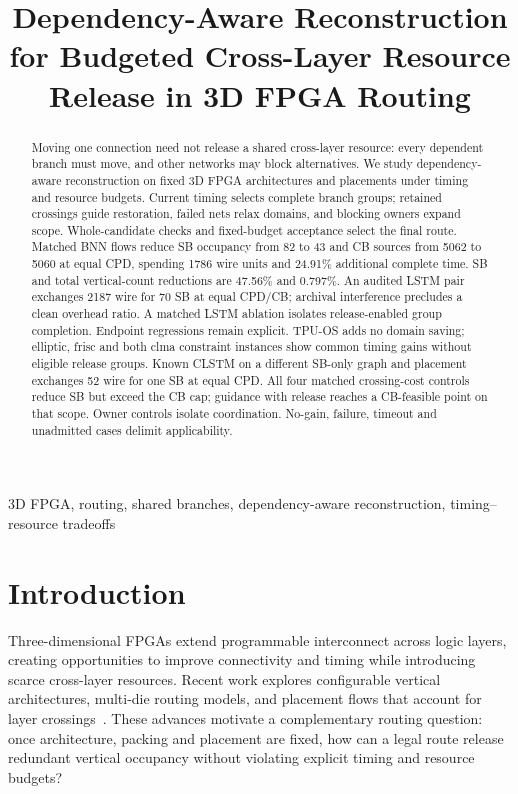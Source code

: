 \documentclass[conference,10pt]{IEEEtran}
\title{Dependency-Aware Reconstruction for Budgeted Cross-Layer Resource Release in 3D FPGA Routing}
\author{\IEEEauthorblockN{Anonymous submission}}
\begin{document}
\maketitle
\begin{abstract}
Moving one connection need not release a shared cross-layer resource: every dependent branch must move, and other networks may block alternatives. We study dependency-aware reconstruction on fixed 3D FPGA architectures and placements under timing and resource budgets. Current timing selects complete branch groups; retained crossings guide restoration, failed nets relax domains, and blocking owners expand scope. Whole-candidate checks and fixed-budget acceptance select the final route. Matched BNN flows reduce SB occupancy from 82 to 43 and CB sources from 5062 to 5060 at equal CPD, spending 1786 wire units and 24.91\% additional complete time. SB and total vertical-count reductions are 47.56\% and 0.797\%. An audited LSTM pair exchanges 2187 wire for 70 SB at equal CPD/CB; archival interference precludes a clean overhead ratio. A matched LSTM ablation isolates release-enabled group completion. Endpoint regressions remain explicit. TPU-OS adds no domain saving; elliptic, frisc and both clma constraint instances show common timing gains without eligible release groups. Known CLSTM on a different SB-only graph and placement exchanges 52 wire for one SB at equal CPD. All four matched crossing-cost controls reduce SB but exceed the CB cap; guidance with release reaches a CB-feasible point on that scope. Owner controls isolate coordination. No-gain, failure, timeout and unadmitted cases delimit applicability.
\end{abstract}
\begin{IEEEkeywords}
3D FPGA, routing, shared branches, dependency-aware reconstruction, timing--resource tradeoffs
\end{IEEEkeywords}

\section{Introduction}
Three-dimensional FPGAs extend programmable interconnect across logic layers, creating opportunities to improve connectivity and timing while introducing scarce cross-layer resources. Recent work explores configurable vertical architectures, multi-die routing models, and placement flows that account for layer crossings~\cite{lazagna,multidie,flatland}. These advances motivate a complementary routing question: once architecture, packing and placement are fixed, how can a legal route release redundant vertical occupancy without violating explicit timing and resource budgets?
\end{document}
